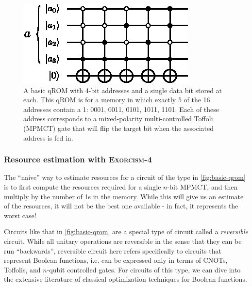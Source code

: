 \documentclass[a4paper,12pt]{article}
\begin{document}
\begin{figure}
 \centering
 \captionsetup{width=0.89\linewidth}
 \includegraphics[scale=1.6]{images/basic-qrom}
 \caption{A basic qROM with 4-bit addresses and a single data bit stored at each. This qROM is for a memory in which exactly 5 of the 16 addresses contain a 1: 0001, 0011, 0101, 1011, 1101. Each of these address corresponds to a mixed-polarity multi-controlled Toffoli (MPMCT) gate that will flip the target bit when the associated address is fed in.}
 \label{fig:basic-qrom}
\end{figure}

\subsubsection{Resource estimation with \textsc{Exorcism-4}}

The ``naive'' way to estimate resources for a circuit of the type in \autoref{fig:basic-qrom} is to first compute the resources required for a single $n$-bit MPMCT, and then multiply by the number of 1s in the memory. While this will give us an estimate of the resources, it will not be the best one available - in fact, it represents the worst case!

Circuits like that in \autoref{fig:basic-qrom} are a special type of circuit called a \emph{reversible} circuit. While all unitary operations are reversible in the sense that they can be run ``backwards'', reversible circuit here refers specifically to circuits that represent Boolean functions, i.e. can be expressed only in terms of CNOTs, Toffolis, and $n$-qubit controlled gates. For circuits of this type, we can dive into the extensive literature of classical optimization techniques for Boolean functions. 
\end{document}
